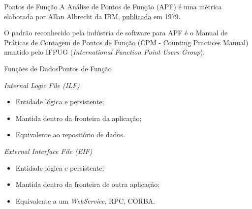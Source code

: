 
\begin{frame}{Pontos de Função}
  A Análise de Pontos de Função (APF) é uma métrica elaborada por
  Allan Albrecht da IBM,
  \href{http://fattocs.com/files/pt/artigos/MedindoaProdutividadedoDesenvolvimentodeAplicativos.pdf}{publicada}
  em 1979.\pause\bigskip

  O padrão reconhecido pela indústria de software para APF é o Manual
  de Práticas de Contagem de Pontos de Função (CPM - Counting
  Practices Manual) mantido pelo IFPUG ({\em International Function
    Point Users Group}).

\end{frame}

\begin{frame}{Funções de Dados}{Pontos de Função}
  \small
  \begin{description}[<+->]
  \item[Arquivos Lógicos Internos (ALI):] {\em Internal Logic File (ILF)}
    \begin{itemize}
    \item Entidade lógica e persistente;
    \item Mantida dentro da fronteira da aplicação;
    \item Equivalente ao repositório de dados.
    \end{itemize}

  \item[Arquivos de Interface Externa (AIE):] {\em External Interface File (EIF)}
    \begin{itemize}
    \item Entidade lógica e persistente;
    \item Mantida dentro da fronteira de outra aplicação;
    \item Equivalente a um {\em WebService}, RPC, CORBA.
    \end{itemize}
  \end{description}
\end{frame}


